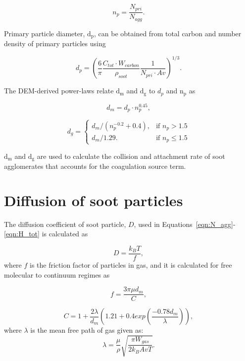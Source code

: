 \begin{equation}
	n_p = \frac{N_{pri}}{N_{agg}}
	\label{eqn:n_p}.
\end{equation}

Primary particle diameter, $\mathrm{d_p}$, can be obtained from total carbon and number density of primary particles using

\begin{equation}
	d_p = \left(\frac{6}{\pi} \frac{C_{tot}\cdot W_{carbon}}{\rho_{soot}} \frac{1}{N_{pri}\cdot Av} \right)^{1/3}
	\label{eqn:d_p}.
\end{equation}

The DEM-derived power-laws relate $\mathrm{d_m}$ and $\mathrm{d_g}$ to $d_p$ and $\mathrm{n_p}$ as

\begin{equation}
	d_{m} = d_p\cdot n_p^{0.45}
	\label{eqn:d_m},
\end{equation}

\begin{equation}
	d_g = 
	\left\{
	\begin{array}{lr}
		d_m/(n_p^{-0.2}+0.4), & \text{if } n_p > 1.5\\
		d_m/1.29. & \text{if } n_p\leq 1.5
	\end{array}
	\right.
	\label{eqn:d_g}
\end{equation}

$\mathrm{d_{m}}$ and $\mathrm{d_{g}}$ are used to calculate the collision and attachment rate of soot agglomerates that accounts for the coagulation source term.   

\section{Diffusion of soot particles}

The diffusion coefficient of soot particle, $D$, used in Equations~\eqref{eqn:N_agg}-\eqref{eqn:H_tot} is calculated as

\begin{equation}
	D = \frac{k_B T}{f}
	\label{eqn:diff},
\end{equation}
\noindent where $f$ is the friction factor of particles in gas, and it is calculated for free molecular to continuum regimes as

\begin{equation}
	f = \frac{3\pi\mu d_m}{C}
	\label{eqn:fraction},
\end{equation}

\begin{equation}
	C = 1+\frac{2\lambda}{d_m}
	\left(
	1.21+0.4exp(\frac{-0.78d_m}{\lambda})
	\right)
	\label{eqn:cun},
\end{equation}
\noindent where $\lambda$ is the mean free path of gas given as:
\begin{equation}
	\lambda = \frac{\mu}{\rho}\sqrt{\frac{\pi W_{gas}}{2k_B Av T}}
	\label{eqn:lambda}.
\end{equation}


